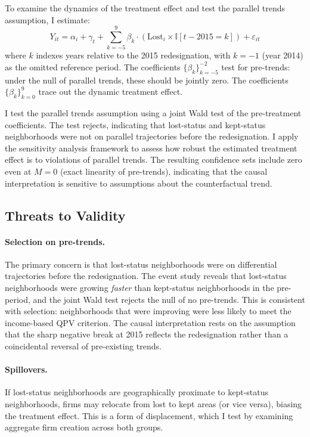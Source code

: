 \documentclass[12pt]{article}
\newcommand{\ind}{\mathbb{I}}
\begin{document}
To examine the dynamics of the treatment effect and test the parallel trends assumption, I estimate:
\begin{equation}
Y_{it} = \alpha_i + \gamma_t + \sum_{k=-5}^{9} \beta_k \cdot (\text{Lost}_i \times \ind[t - 2015 = k]) + \varepsilon_{it}
\label{eq:eventstudy}
\end{equation}
where $k$ indexes years relative to the 2015 redesignation, with $k = -1$ (year 2014) as the omitted reference period. The coefficients $\{\beta_k\}_{k=-5}^{-2}$ test for pre-trends: under the null of parallel trends, these should be jointly zero. The coefficients $\{\beta_k\}_{k=0}^{9}$ trace out the dynamic treatment effect.

I test the parallel trends assumption using a joint Wald test of the pre-treatment coefficients. The test rejects, indicating that lost-status and kept-status neighborhoods were not on parallel trajectories before the redesignation. I apply the \citet{rambachan2023more} sensitivity analysis framework to assess how robust the estimated treatment effect is to violations of parallel trends. The resulting confidence sets include zero even at $M = 0$ (exact linearity of pre-trends), indicating that the causal interpretation is sensitive to assumptions about the counterfactual trend.

\subsection{Threats to Validity}

\paragraph{Selection on pre-trends.} The primary concern is that lost-status neighborhoods were on differential trajectories before the redesignation. The event study reveals that lost-status neighborhoods were growing \textit{faster} than kept-status neighborhoods in the pre-period, and the joint Wald test rejects the null of no pre-trends. This is consistent with selection: neighborhoods that were improving were less likely to meet the income-based QPV criterion. The causal interpretation rests on the assumption that the sharp negative break at 2015 reflects the redesignation rather than a coincidental reversal of pre-existing trends.

\paragraph{Spillovers.} If lost-status neighborhoods are geographically proximate to kept-status neighborhoods, firms may relocate from lost to kept areas (or vice versa), biasing the treatment effect. This is a form of displacement, which I test by examining aggregate firm creation across both groups.
\end{document}
